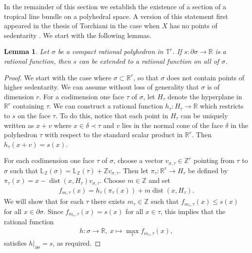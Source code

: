 \documentclass[11pt]{article}
\numberwithin{equation}{numsection}
\newcommand{\ZZ}{{\mathbb Z}}
\newcommand{\Z}{{\mathbb Z}}
\newcommand{\R}{{\mathbb R}}
\newcommand{\TT}{{\mathbb T}}
\newcommand{\Linear}{\mathbb{L}}
\DeclareMathOperator{\dist}{dist}
\newtheorem{lemma}[thm]{Lemma}
\begin{document}
In the remainder of this section we establish the existence of a section of a tropical line bundle on a polyhedral space.
A version of this  statement first appeared in the thesis of Torchiani in the case 
when $X$ has no points of sedentarity  \cite[Theorem 2.3.4]{CaroThesis}. 
We start with the following lemmas.





\begin{lemma}\label{lem:piecewiseaffineonsigma}
Let  $\sigma$  be a compact rational polyhedron in $\TT^r$.
If $s \colon  \partial \sigma \to \R$ is a 
rational function, 
then $s$ can be extended to a rational function on all of $\sigma$.
\end{lemma}



\begin{proof}
We start with the case where $\sigma \subset \R^r$, so that  
$\sigma$ does not contain points of higher sedentarity.
We can assume without loss of generality that $\sigma$ is of dimension $r$. 
For a codimension one  face $\tau $ of $\sigma$, let $H_{\tau}$ denote the hyperplane in $\R^r$ containing $\tau$. 
We can construct a rational  function $h_{\tau} \colon H_{\tau} \rightarrow \R$ 
which restricts to $s$ on the face $\tau$. 
To do this, notice that each point in $H_{\tau}$ can be uniquely written as $x + v$ 
where $x \in \delta \prec \tau$ and $v$ 
lies in the normal cone of the face $\delta$ in the  polyhedron $\tau$ with respect to the standard scalar product in $\R^r$. 
Then $h_{\tau}(x + v) = s(x)$. 

For each codimension one  face $\tau$ of  $\sigma$, choose 
a vector $v_{\sigma,\tau} \in \ZZ^r$ pointing from 
$\tau$ to $\sigma$ such that $\Linear_{\Z}(\sigma) = \Linear_{\Z}(\tau) + \ZZ v_{\sigma,\tau}$.
Then let $\pi_{\tau} \colon \R^r \to H_ \tau$   be 
defined by $ \pi_\tau(x)  = x -  \dist(x, H_\tau) v_{\sigma, \tau}$. Choose $m \in \ZZ$ and set
\begin{align*}
  f_{m, \tau}(x) = h_\tau(\pi_\tau(x)) + m \dist(x,H_\tau).
\end{align*}
We will show that for each $\tau$ there exists $m_{\tau} \in \ZZ$ such that $f_{m_\tau,\tau}(x) \leq s(x)$ 
for all $x \in \partial \sigma$. Since $f_{m_\tau,\tau}(x)  = s(x)$ 
for all $x \in \tau$, 
this implies that 
the rational function 
\begin{align}\label{eqn:defh}
  h \colon \sigma \to \R, \ x \mapsto \max_\tau {f_{m_{\tau}, \tau}(x)},
\end{align}
satisfies $h|_{\partial \sigma} = s$, as required.


\end{proof}
\end{document}
